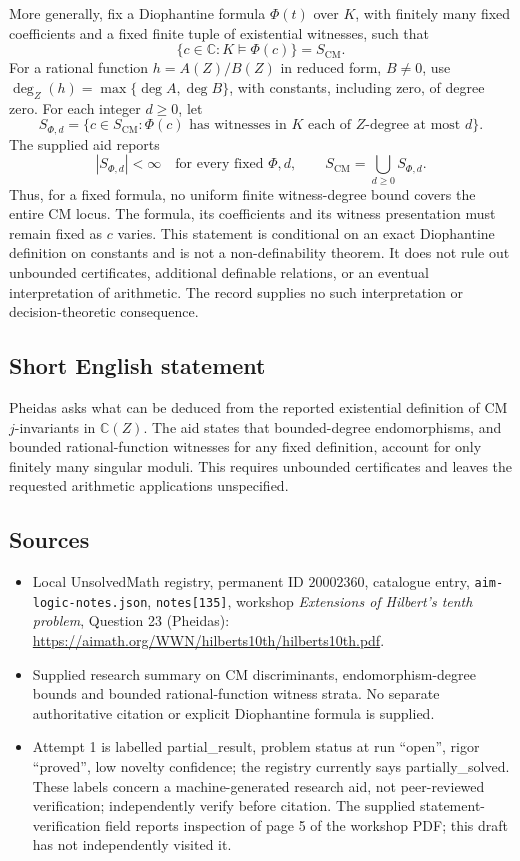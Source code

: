 \documentclass[11pt]{article}
\newcommand{\C}{\mathbb{C}}
\begin{document}
More generally, fix a Diophantine formula \(\Phi(t)\) over \(K\), with finitely many fixed coefficients and a fixed finite tuple of existential witnesses, such that
\[
 \{c\in\C:K\models\Phi(c)\}=S_{\mathrm{CM}}.
\]
For a rational function \(h=A(Z)/B(Z)\) in reduced form, \(B\ne0\), use \(\deg_Z(h)=\max\{\deg A,\deg B\}\), with constants, including zero, of degree zero. For each integer \(d\geq0\), let
\[
 S_{\Phi,d}=\{c\in S_{\mathrm{CM}}:\Phi(c)\text{ has witnesses in }K
 \text{ each of }Z\text{-degree at most }d\}.
\]
The supplied aid reports
\[
 |S_{\Phi,d}|<\infty\quad\text{for every fixed }\Phi,d,
 \qquad S_{\mathrm{CM}}=\bigcup_{d\geq0}S_{\Phi,d}.
\]
Thus, for a fixed formula, no uniform finite witness-degree bound covers the entire CM locus. The formula, its coefficients and its witness presentation must remain fixed as \(c\) varies. This statement is conditional on an exact Diophantine definition on constants and is not a non-definability theorem. It does not rule out unbounded certificates, additional definable relations, or an eventual interpretation of arithmetic. The record supplies no such interpretation or decision-theoretic consequence.
\subsection{Short English statement}
Pheidas asks what can be deduced from the reported existential definition of CM \(j\)-invariants in \(\C(Z)\). The aid states that bounded-degree endomorphisms, and bounded rational-function witnesses for any fixed definition, account for only finitely many singular moduli. This requires unbounded certificates and leaves the requested arithmetic applications unspecified.
\subsection{Sources}
\begin{itemize}
\item Local UnsolvedMath registry, permanent ID \(20002360\), catalogue entry, \texttt{aim-logic-notes.json}, \texttt{notes[135]}, workshop \emph{Extensions of Hilbert's tenth problem}, Question 23 (Pheidas): \url{https://aimath.org/WWN/hilberts10th/hilberts10th.pdf}.
\item Supplied research summary on CM discriminants, endomorphism-degree bounds and bounded rational-function witness strata. No separate authoritative citation or explicit Diophantine formula is supplied.
\item Attempt 1 is labelled partial\_result, problem status at run ``open'', rigor ``proved'', low novelty confidence; the registry currently says partially\_solved. These labels concern a machine-generated research aid, not peer-reviewed verification; independently verify before citation. The supplied statement-verification field reports inspection of page 5 of the workshop PDF; this draft has not independently visited it.
\end{itemize}
\end{document}
